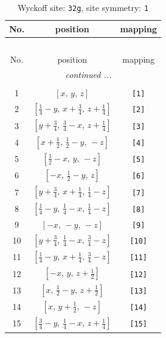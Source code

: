 \documentclass[fleqn,8pt]{jsarticle}
\begin{document}
\renewcommand{\arraystretch}{1.2}
\begin{longtable}{ccc}
\caption{Wyckoff site: {\tt 32g}, site symmetry: {\tt 1}}
 \\
 \hline \hline
No. & position & mapping \\ \hline \endfirsthead

\multicolumn{2}{l}{\tablename\ \thetable{}} \\
 \hline \hline
No. & position & mapping \\ \hline \endhead

 \hline \hline
\multicolumn{2}{r}{\footnotesize\it continued ...} \\ \endfoot

 \hline \hline
\multicolumn{2}{r}{} \\ \endlastfoot

1 & $\left[ x,\, y,\, z \right]$ & {\tt [1]} \\ \hline
2 & $\left[ \frac{1}{4} - y,\, x + \frac{3}{4},\, z + \frac{1}{4} \right]$ & {\tt [2]} \\ \hline
3 & $\left[ y + \frac{3}{4},\, \frac{3}{4} - x,\, z + \frac{1}{4} \right]$ & {\tt [3]} \\ \hline
4 & $\left[ x + \frac{1}{2},\, \frac{1}{2} - y,\, - z \right]$ & {\tt [4]} \\ \hline
5 & $\left[ \frac{1}{2} - x,\, y,\, - z \right]$ & {\tt [5]} \\ \hline
6 & $\left[ - x,\, \frac{1}{2} - y,\, z \right]$ & {\tt [6]} \\ \hline
7 & $\left[ y + \frac{3}{4},\, x + \frac{1}{4},\, \frac{1}{4} - z \right]$ & {\tt [7]} \\ \hline
8 & $\left[ \frac{1}{4} - y,\, \frac{1}{4} - x,\, \frac{1}{4} - z \right]$ & {\tt [8]} \\ \hline
9 & $\left[ - x,\, - y,\, - z \right]$ & {\tt [9]} \\ \hline
10 & $\left[ y + \frac{3}{4},\, \frac{1}{4} - x,\, \frac{3}{4} - z \right]$ & {\tt [10]} \\ \hline
11 & $\left[ \frac{1}{4} - y,\, x + \frac{1}{4},\, \frac{3}{4} - z \right]$ & {\tt [11]} \\ \hline
12 & $\left[ - x,\, y,\, z + \frac{1}{2} \right]$ & {\tt [12]} \\ \hline
13 & $\left[ x,\, \frac{1}{2} - y,\, z + \frac{1}{2} \right]$ & {\tt [13]} \\ \hline
14 & $\left[ x,\, y + \frac{1}{2},\, - z \right]$ & {\tt [14]} \\ \hline
15 & $\left[ \frac{3}{4} - y,\, \frac{1}{4} - x,\, z + \frac{1}{4} \right]$ & {\tt [15]} \\ \hline

\end{longtable}
\end{document}
